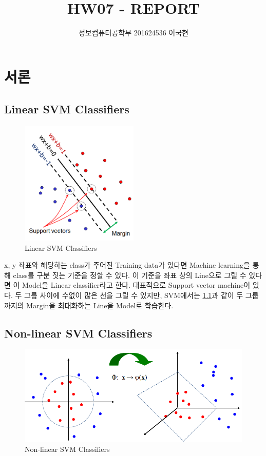 \documentclass[]{report}
\title{HW07 - REPORT}
\author{정보컴퓨터공학부 201624536 이국현}
\begin{document}
\maketitle


\chapter{서론}

\section{Linear SVM Classifiers}

\begin{figure}[ht!]
    \centering
    \includegraphics[width=0.5\textwidth]{image/SVM.png}
    \caption{Linear SVM Classifiers}
    \label{SVM}
\end{figure}

x, y 좌표와 해당하는 class가 주어진 Training data가 있다면
Machine learning을 통해 class를 구분 짓는 기준을 정할 수 있다.
이 기준을 좌표 상의 Line으로 그릴 수 있다면 이 Model을 Linear classifier라고 한다. 
대표적으로 Support vector machine이 있다. 두 그룹 사이에 수없이 많은 선을 그릴 수 있지만,
SVM에서는 \ref{SVM}과 같이 두 그룹까지의 Margin을 최대화하는 Line을 Model로 학습한다.  \\

\section{Non-linear SVM Classifiers}

\begin{figure}[ht!]
    \centering
    \includegraphics[width=1\textwidth]{image/pi.png}
    \caption{Non-linear SVM Classifiers}
    \label{pi}
\end{figure}
\end{document}
